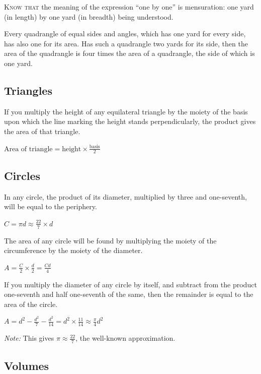 \documentclass[11pt,a4paper]{book}
\newcommand{\cnote}[1]{\textcolor{notecolor}{\textit{#1}}}
\begin{document}
\begin{minipage}[t]{0.48\textwidth}
\raggedright

\lettrine[lines=2, lhang=0.33, nindent=0em, findent=3pt, loversize=0.14]{
\textcolor{dropgold}{K}}{now that} the meaning of the expression ``one by one'' is mensuration: one yard (in length) by one yard (in breadth) being understood.

Every quadrangle of equal sides and angles, which has one yard for every side, has also one for its area. Has such a quadrangle two yards for its side, then the area of the quadrangle is four times the area of a quadrangle, the side of which is one yard.

\subsection*{Triangles}

If you multiply the height of any equilateral triangle by the moiety of the basis upon which the line marking the height stands perpendicularly, the product gives the area of that triangle.

$\text{Area of triangle} = \text{height} \times \frac{\text{basis}}{2}$

\subsection*{Circles}

In any circle, the product of its diameter, multiplied by three and one-seventh, will be equal to the periphery.

$C = \pi d \approx \frac{22}{7} \times d$

The area of any circle will be found by multiplying the moiety of the circumference by the moiety of the diameter.

$A = \frac{C}{2} \times \frac{d}{2} = \frac{Cd}{4}$

If you multiply the diameter of any circle by itself, and subtract from the product one-seventh and half one-seventh of the same, then the remainder is equal to the area of the circle.

$A = d^2 - \frac{d^2}{7} - \frac{d^2}{14} = d^2 \times \frac{11}{14} \approx \frac{\pi}{4} d^2$

\cnote{Note:} This gives $\pi \approx \frac{22}{7}$, the well-known approximation.

\subsection*{Volumes}


\end{minipage}
\end{document}
